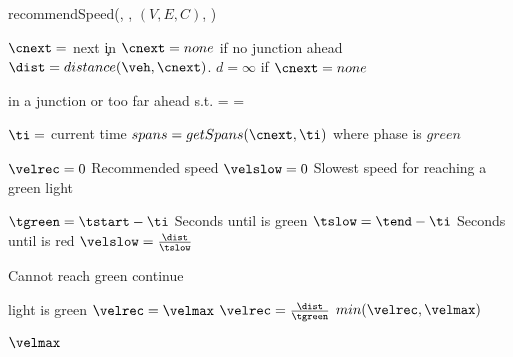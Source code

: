 \begin{algorithm}
\caption{recommendSpeed(\veh, \route, $(V, E, C)$, \distmax)}\label{alg.recommendedSpeed}
\begin{algorithmic}[1]
\State $\cnext= $ next \c in \route\Comment $\cnext=none$ if no junction ahead \label{alg:recSpeed:cnext}
\State $\dist=distance(\veh,\cnext)$. \Comment $d=\infty$ if $\cnext=none$\label{alg:recSpeed:distance}

\State \Comment \veh in a junction or \cnext too far ahead\label{alg:recSpeed:injunction}
\State\Return \espeed s.t. \eend=\vehposstart
\Else
\State \velmax = \vehposspeed
\EndIf

\State $\ti=$ current time
\State $spans = getSpans(\cnext, \ti)$ \Comment where phase is $green$ \label{alg:recSpeed:getSpan}

\State $\velrec = 0$ \Comment Recommended speed \label{alg:recSpeed:velrec}
\State $\velslow = 0$ \Comment Slowest speed for reaching a green light \label{alg:recSpeed:velslow}

\label{alg:recSpeed:loopSpans}
\State $\tgreen = \tstart - \ti$ \Comment Seconds until \cnextphase is green \label{alg:recSpeed:tg}
\State $\tslow = \tend - \ti$ \Comment Seconds until \cnextphase is red\label{alg:recSpeed:tr}
\State $\velslow = \frac{\dist}{\tslow}$\label{alg:recSpeed:hr}

\Comment Cannot reach green\label{alg:recSpeed:continue}
\State continue
\EndIf

\Comment light is green\label{alg:recSpeed:green}
\State $\velrec=\velmax$
\Else
\State $\velrec = \frac{\dist}{\tgreen}$\label{alg:recSpeed:h}
\EndIf
\State\Return $min(\velrec, \velmax)$\label{alg:recSpeed:returnh}
\EndFor\label{alg:recSpeed:loopSpansEnd}

\State\Return $\velmax$\label{alg:recSpeed:returnmax}

\end{algorithmic}
\end{algorithm}